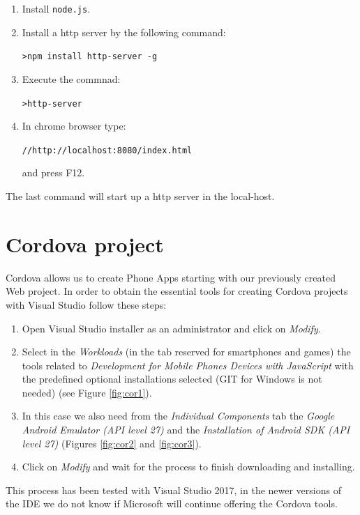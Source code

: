 \begin{enumerate}[nosep] 
	\item Install \verb|node.js|. 
	\item Install a http server by the following command:
	
	      \verb|>npm install http-server -g|
	      
	\item Execute the commnad: 
    
      \verb|>http-server|
      
	\item  In chrome browser type:
    
     \verb|//http://localhost:8080/index.html|
     
      and press F12. 
\end{enumerate} 

The last command will start up a http server in the local-host. 
    


    \FloatBarrier
    \section{Cordova project}

Cordova allows us to create Phone Apps starting with our previously created Web project. In order to obtain the essential tools for creating Cordova projects with Visual Studio follow these steps:

\begin{enumerate}
    \item Open Visual Studio installer as an administrator and click on \textit{Modify}.
    \item Select in the \textit{Workloads} (in the tab reserved for smartphones and games) the tools related to \textit{Development for Mobile Phones Devices with JavaScript} with the predefined optional installations selected (GIT for Windows is not needed) (see Figure \ref{fig:cor1}).
    \item In this case we also need from the \textit{Individual Components} tab the \textit{Google Android Emulator (API level 27)} and the \textit{Installation of Android SDK (API level 27)} (Figures \ref{fig:cor2} and \ref{fig:cor3}).
    \item Click on \textit{Modify} and wait for the process to finish downloading and installing.
\end{enumerate}

\begin{IN}
    This process has been tested with Visual Studio 2017, in the newer versions of the IDE we do not know if Microsoft will continue offering the Cordova tools.
\end{IN}

